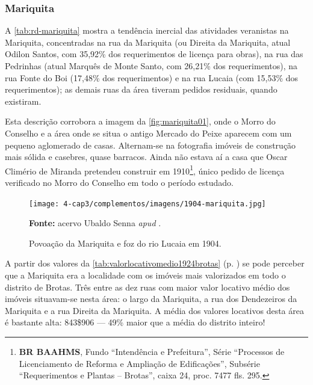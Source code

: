 \subsubsection{Mariquita}


A \autoref{tab:rd-mariquita} mostra a tendência inercial das atividades veranistas na Mariquita, concentradas na rua da Mariquita (ou Direita da Mariquita, atual Odilon Santos, com 35,92\% dos requerimentos de licença para obras), na rua das Pedrinhas (atual Marquês de Monte Santo, com 26,21\% dos requerimentos), na rua Fonte do Boi (17,48\% dos requerimentos) e na rua Lucaia (com 15,53\% dos requerimentos); as demais ruas da área tiveram pedidos residuais, quando existiram.





Esta descrição corrobora a imagem da \autoref{fig:mariquita01}, onde o Morro do Conselho e a área onde se situa o antigo Mercado do Peixe aparecem com um pequeno aglomerado de casas. Alternam-se na fotografia imóveis de construção mais sólida e casebres, quase barracos. Ainda não estava aí a casa que Oscar Climério de Miranda pretendeu construir em 1910\footnote{\textbf{BR BAAHMS}, Fundo ``Intendência e Prefeitura'', Série ``Processos de Licenciamento de Reforma e Ampliação de Edificações'', Subsérie ``Requerimentos e Plantas -- Brotas'', caixa 24, proc. 7477 fls. 295.}, único pedido de licença verificado no Morro do Conselho em todo o período estudado.

\begin{figure}[!htp]
\centering
\caption{Povoação da Mariquita e foz do rio Lucaia em 1904.}\texttt{[image: 4-cap3/complementos/imagens/1904-mariquita.jpg]}{\par \footnotesize \textbf{Fonte:} acervo Ubaldo Senna \textit{apud} . }
\label{fig:mariquita01}
\end{figure}


A partir dos valores da \autoref{tab:valorlocativomedio1924brotas} (p. \pageref{tab:valorlocativomedio1924brotas}) se pode perceber que a Mariquita era a localidade com os imóveis mais valorizados em todo o distrito de Brotas. Três entre as dez ruas com maior valor locativo médio dos imóveis situavam-se nesta área: o largo da Mariquita, a rua dos Dendezeiros da Mariquita e a rua Direita da Mariquita. A média dos valores locativos desta área é bastante alta: 843\$906 --- 49\% maior que a média do distrito inteiro! 

